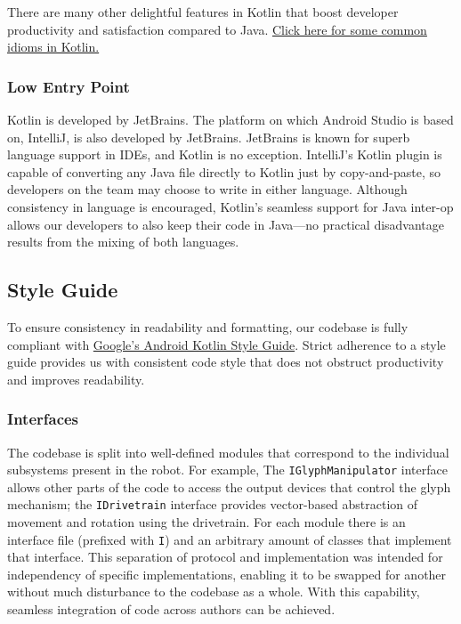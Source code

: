 \documentclass{article}
\begin{document}
There are many other delightful features in Kotlin that boost developer productivity and satisfaction compared to Java. \href{https://kotlinlang.org/docs/reference/idioms.html}{Click here for some common idioms in Kotlin.}

\subsubsection{Low Entry Point}

Kotlin is developed by JetBrains. The platform on which Android Studio is based on, IntelliJ, is also developed by JetBrains. JetBrains is known for superb language support in IDEs, and Kotlin is no exception. IntelliJ's Kotlin plugin is capable of converting any Java file directly to Kotlin just by copy-and-paste, so developers on the team may choose to write in either language. Although consistency in language is encouraged, Kotlin's seamless support for Java inter-op allows our developers to also keep their code in Java---no practical disadvantage results from the mixing of both languages.

\subsection{Style Guide}

To ensure consistency in readability and formatting, our codebase is fully compliant with \href{https://android.github.io/kotlin-guides/style.html}{Google's Android Kotlin Style Guide}. Strict adherence to a style guide provides us with consistent code style that does not obstruct productivity and improves readability.

\subsubsection{Interfaces}

The codebase is split into well-defined modules that correspond to the individual subsystems present in the robot. For example, The \texttt{IGlyphManipulator} interface allows other parts of the code to access the output devices that control the glyph mechanism; the \texttt{IDrivetrain} interface provides vector-based abstraction of movement and rotation using the drivetrain. For each module there is an interface file (prefixed with \texttt{I}) and an arbitrary amount of classes that implement that interface. This separation of protocol and implementation was intended for independency of specific implementations, enabling it to be swapped for another without much disturbance to the codebase as a whole. With this capability, seamless integration of code across authors can be achieved.
\end{document}
